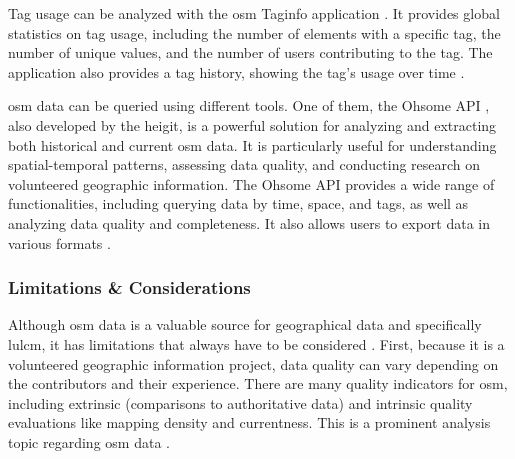 Tag usage can be analyzed with the \gls{osm} Taginfo application \autocite{OSMFoundation2024}. It provides global statistics on tag usage, including the number of elements with a specific tag, the number of unique values, and the number of users contributing to the tag. The application also provides a tag history, showing the tag's usage over time \autocite{Minghini.Frassinelli2019,OSMFoundation2024}.

\gls{osm} data can be queried using different tools. One of them, the Ohsome API \autocite{Raifer.Troilo.ea2019}, also developed by the \gls{heigit}, is a powerful solution for analyzing and extracting both historical and current \gls{osm} data. It is particularly useful for understanding spatial-temporal patterns, assessing data quality, and conducting research on volunteered geographic information. The Ohsome API provides a wide range of functionalities, including querying data by time, space, and tags, as well as analyzing data quality and completeness. It also allows users to export data in various formats \autocite{Auer.Eckle.ea2018}.

\subsubsection*{Limitations \& Considerations}

Although \gls{osm} data is a valuable source for geographical data and specifically \gls{lulcm}, it has limitations that always have to be considered \autocite{Minghini.Frassinelli2019}. First, because it is a volunteered geographic information project, data quality can vary depending on the contributors and their experience. There are many quality indicators for \gls{osm}, including extrinsic (comparisons to authoritative data) and intrinsic quality evaluations like mapping density and currentness. This is a prominent analysis topic regarding \gls{osm} data \autocite{JokarArsanjani.Mooney.ea2015,Schott.Zell.ea2024}.

